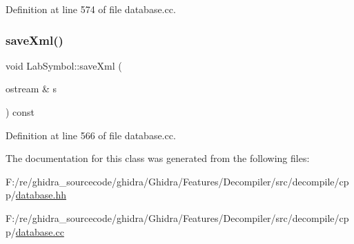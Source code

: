 Definition at line 574 of file database.\+cc.

\mbox{\label{class_lab_symbol_aa923d358bf51dff4957f202e34d140be}} 
\subsubsection{\texorpdfstring{saveXml()}{saveXml()}}
{\footnotesize\ttfamily void Lab\+Symbol\+::save\+Xml (\begin{DoxyParamCaption}\item[{ostream \&}]{s }\end{DoxyParamCaption}) const\hspace{0.3cm}{\ttfamily [virtual]}}



Definition at line 566 of file database.\+cc.



The documentation for this class was generated from the following files\+:\begin{DoxyCompactItemize}
\item 
F\+:/re/ghidra\+\_\+sourcecode/ghidra/\+Ghidra/\+Features/\+Decompiler/src/decompile/cpp/\mbox{\hyperlink{database_8hh}{database.\+hh}}\item 
F\+:/re/ghidra\+\_\+sourcecode/ghidra/\+Ghidra/\+Features/\+Decompiler/src/decompile/cpp/\mbox{\hyperlink{database_8cc}{database.\+cc}}\end{DoxyCompactItemize}
